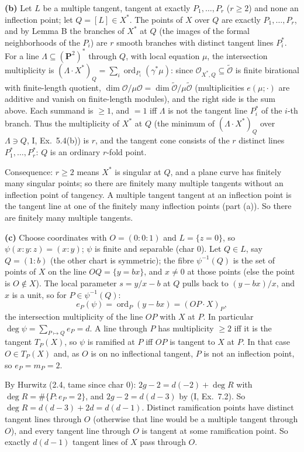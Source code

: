 \documentclass[11pt]{article}
\begin{document}
\textbf{(b)} Let $L$ be a multiple tangent, tangent at exactly $P_1,\dots,P_r$ ($r\ge2$) and none an inflection point; let $Q=[L]\in X^*$. The points of $X$ over $Q$ are exactly $P_1,\dots,P_r$, and by Lemma B the branches of $X^*$ at $Q$ (the images of the formal neighborhoods of the $P_i$) are $r$ smooth branches with distinct tangent lines $P_i^*$. For a line $\Lambda\subseteq(\mathbf P^2)^*$ through $Q$, with local equation $\mu$, the intersection multiplicity is $(\Lambda\cdot X^*)_Q=\sum_i\operatorname{ord}_{P_i}(\gamma^*\mu)$: since $\mathcal O_{X^*,Q}\subseteq\widetilde{\mathcal O}$ is finite birational with finite-length quotient, $\dim\mathcal O/\mu\mathcal O=\dim\widetilde{\mathcal O}/\mu\widetilde{\mathcal O}$ (multiplicities $e(\mu;\cdot)$ are additive and vanish on finite-length modules), and the right side is the sum above. Each summand is $\ge1$, and $=1$ iff $\Lambda$ is not the tangent line $P_i^*$ of the $i$-th branch. Thus the multiplicity of $X^*$ at $Q$ (the minimum of $(\Lambda\cdot X^*)_Q$ over $\Lambda\ni Q$, I, Ex.~5.4(b)) is $r$, and the tangent cone consists of the $r$ distinct lines $P_1^*,\dots,P_r^*$: $Q$ is an ordinary $r$-fold point.

Consequence: $r\ge2$ means $X^*$ is singular at $Q$, and a plane curve has finitely many singular points; so there are finitely many multiple tangents without an inflection point of tangency. A multiple tangent tangent at an inflection point is the tangent line at one of the finitely many inflection points (part (a)). So there are finitely many multiple tangents.

\textbf{(c)} Choose coordinates with $O=(0:0:1)$ and $L=\{z=0\}$, so $\psi(x:y:z)=(x:y)$; $\psi$ is finite and separable (char $0$). Let $Q\in L$, say $Q=(1:b)$ (the other chart is symmetric); the fibre $\psi^{-1}(Q)$ is the set of points of $X$ on the line $OQ=\{y=bx\}$, and $x\ne0$ at those points (else the point is $O\notin X$). The local parameter $s=y/x-b$ at $Q$ pulls back to $(y-bx)/x$, and $x$ is a unit, so for $P\in\psi^{-1}(Q)$:
\[
e_P(\psi)=\operatorname{ord}_P(y-bx)=(OP\cdot X)_P,
\]
the intersection multiplicity of the line $OP$ with $X$ at $P$. In particular $\deg\psi=\sum_{P\mapsto Q}e_P=d$. A line through $P$ has multiplicity $\ge2$ iff it is the tangent $T_P(X)$, so $\psi$ is ramified at $P$ iff $OP$ is tangent to $X$ at $P$. In that case $O\in T_P(X)$ and, as $O$ is on no inflectional tangent, $P$ is not an inflection point, so $e_P=m_P=2$.

By Hurwitz (2.4, tame since char $0$): $2g-2=d(-2)+\deg R$ with $\deg R=\#\{P:e_P=2\}$, and $2g-2=d(d-3)$ by (I, Ex.~7.2). So $\deg R=d(d-3)+2d=d(d-1)$. Distinct ramification points have distinct tangent lines through $O$ (otherwise that line would be a multiple tangent through $O$), and every tangent line through $O$ is tangent at some ramification point. So exactly $d(d-1)$ tangent lines of $X$ pass through $O$.
\end{document}
